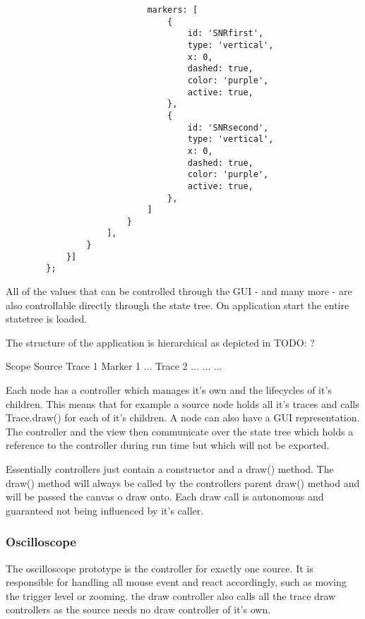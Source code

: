 \begin{tcolorbox}
\begin{verbatim}
                            markers: [
                                {
                                    id: 'SNRfirst',
                                    type: 'vertical',
                                    x: 0,
                                    dashed: true,
                                    color: 'purple',
                                    active: true,
                                },
                                {
                                    id: 'SNRsecond',
                                    type: 'vertical',
                                    x: 0,
                                    dashed: true,
                                    color: 'purple',
                                    active: true,
                                },
                            ]
                        }
                    ],
                }
            }]
        };
    \end{verbatim}
\end{tcolorbox}

All of the values that can be controlled through the GUI - and many more - are also controllable directly through the state tree.
On application start the entire statetree is loaded.

The structure of the application is hierarchical as depicted in TODO: ?

Scope
    Source
        Trace 1
            Marker 1
            ...
        Trace 2
        ...
    ...
...

Each node has a controller which manages it's own and the lifecycles of it's children. This means that for example a source node holds all it's traces and calls Trace.draw() for each of it's children.
A node can also have a GUI representation. The controller and the view then communicate over the state tree which holds a reference to the controller during run time but which will not be exported.

Essentially controllers just contain a constructor and a draw() method. The draw() method will always be called by the controllers parent draw() method and will be passed the canvas o draw onto.
Each draw call is autonomous and guaranteed not being influenced by it's caller.

\subsubsection*{Oscilloscope}

The oscilloscope prototype is the controller for exactly one source. It is responsible for handling all mouse event and react accordingly, such as moving the trigger level or zooming.
the draw controller also calls all the trace draw controllers as the source needs no draw controller of it's own.

